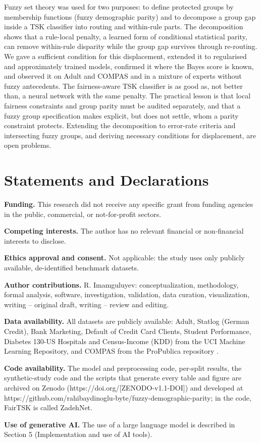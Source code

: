 Fuzzy set theory was used for two purposes: to define protected groups by membership functions (fuzzy demographic parity) and to decompose a group gap inside a TSK classifier into routing and within-rule parts. The decomposition shows that a rule-local penalty, a learned form of conditional statistical parity, can remove within-rule disparity while the group gap survives through re-routing. We gave a sufficient condition for this displacement, extended it to regularised and approximately trained models, confirmed it where the Bayes score is known, and observed it on Adult and COMPAS and in a mixture of experts without fuzzy antecedents. The fairness-aware TSK classifier is as good as, not better than, a neural network with the same penalty. The practical lesson is that local fairness constraints and group parity must be audited separately, and that a fuzzy group specification makes explicit, but does not settle, whom a parity constraint protects. Extending the decomposition to error-rate criteria and intersecting fuzzy groups, and deriving necessary conditions for displacement, are open problems.

\hypertarget{statements-and-declarations}{%
\section{Statements and Declarations}\label{statements-and-declarations}}

\textbf{Funding.} This research did not receive any specific grant from funding agencies in the public, commercial, or not-for-profit sectors.

\textbf{Competing interests.} The author has no relevant financial or non-financial interests to disclose.

\textbf{Ethics approval and consent.} Not applicable: the study uses only publicly available, de-identified benchmark datasets.

\textbf{Author contributions.} R. Imamguluyev: conceptualization, methodology, formal analysis, software, investigation, validation, data curation, visualization, writing -- original draft, writing -- review and editing.

\textbf{Data availability.} All datasets are publicly available: Adult, Statlog (German Credit), Bank Marketing, Default of Credit Card Clients, Student Performance, Diabetes 130-US Hospitals and Census-Income (KDD) from the UCI Machine Learning Repository, and COMPAS from the ProPublica repository \cite{compas}.

\textbf{Code availability.} The model and preprocessing code, per-split results, the synthetic-study code and the scripts that generate every table and figure are archived on Zenodo \cite{software} (https://doi.org/{[}ZENODO-v1.1-DOI{]}) and developed at https://github.com/rahibaydinoglu-byte/fuzzy-demographic-parity; in the code, FairTSK is called ZadehNet.

\textbf{Use of generative AI.} The use of a large language model is described in Section 5 (Implementation and use of AI tools).

